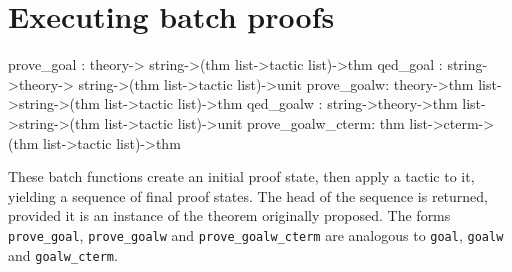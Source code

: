 \section{Executing batch proofs}
\begin{ttbox}
prove_goal :         theory->          string->(thm list->tactic list)->thm
qed_goal   : string->theory->          string->(thm list->tactic list)->unit
prove_goalw:         theory->thm list->string->(thm list->tactic list)->thm
qed_goalw  : string->theory->thm list->string->(thm list->tactic list)->unit
prove_goalw_cterm: thm list->cterm->(thm list->tactic list)->thm
\end{ttbox}
These batch functions create an initial proof state, then apply a tactic to
it, yielding a sequence of final proof states.  The head of the sequence is
returned, provided it is an instance of the theorem originally proposed.
The forms {\tt prove_goal}, {\tt prove_goalw} and {\tt prove_goalw_cterm}
are analogous to {\tt goal}, {\tt goalw} and {\tt goalw_cterm}.


